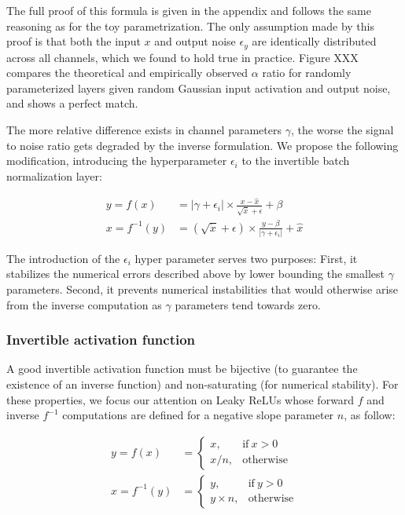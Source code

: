 \documentclass[twocolumn]{bmcart}
\begin{document}
The full proof of this formula is given in the appendix and follows the same reasoning as for the toy parametrization. The only assumption made by this proof is that both the input $x$ and output noise $\epsilon_y$ are identically distributed across all channels, which we found to hold true in practice. Figure XXX compares the theoretical and empirically observed  $\alpha$ ratio for randomly parameterized layers given random Gaussian input activation and output noise, and shows a perfect match.

The more relative difference exists in channel parameters $\gamma$, the worse the signal to noise ratio gets degraded by the inverse formulation.
We propose the following modification, introducing the hyperparameter $\epsilon_i$  to the invertible batch normalization layer:

\begin{subequations}
\begin{align}
y = f(x) &= |\gamma + \epsilon_i| \times \frac{x - \hat{x}}{\sqrt{\dot{x}} + \epsilon} + \beta \\
x = f^{-1}(y) &= (\sqrt{\dot{x}} + \epsilon) \times \frac{y -  \beta}{|\gamma + \epsilon_i|}  + \hat{x}
\end{align}
\end{subequations}

The introduction of the $\epsilon_i$ hyper parameter serves two purposes: 
First, it stabilizes the numerical errors described above by lower bounding the smallest $\gamma$ parameters. 
Second, it prevents numerical instabilities that would otherwise arise from the inverse computation as $\gamma$ parameters tend towards zero. 

\subsubsection{Invertible activation function}

A good invertible activation function must be bijective (to guarantee the existence of an inverse function) and non-saturating (for numerical stability).
For these properties, we focus our attention on Leaky ReLUs whose forward $f$ and inverse $f^{-1}$ computations are defined for a negative slope parameter $n$, as follow:

\begin{subequations}
\begin{align}
y = f(x) &=      \begin{cases}
x, & \text{if}\ x>0 \\
x / n, & \text{otherwise}
\end{cases} \\
x = f^{-1}(y) &= \begin{cases}
y, & \text{if}\ y>0 \\
y \times n, & \text{otherwise}
\end{cases} 
\end{align}
\end{subequations}
\end{document}
